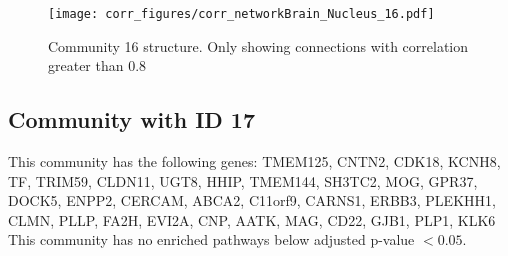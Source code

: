 \begin{figure}[h!]
\centering
\texttt{[image: corr\_figures/corr\_networkBrain\_Nucleus\_16.pdf]}
\caption{Community 16 structure. Only showing connections with correlation greater than 0.8}
\end{figure}




\subsection*{Community with ID 17}
This community has the following genes: TMEM125, CNTN2, CDK18, KCNH8, TF, TRIM59, CLDN11, UGT8, HHIP, TMEM144, SH3TC2, MOG, GPR37, DOCK5, ENPP2, CERCAM, ABCA2, C11orf9, CARNS1, ERBB3, PLEKHH1, CLMN, PLLP, FA2H, EVI2A, CNP, AATK, MAG, CD22, GJB1, PLP1, KLK6
\\
This community has no enriched pathways below adjusted p-value $< 0.05$.


